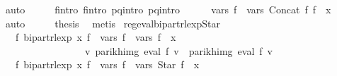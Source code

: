 \begin{isabellebody}
\ auto\isanewline
\ \ \isamarkupfalse%
\ \isamarkupfalse%
\ f{}{\isacharprime}{\kern0pt}{\isacharunderscore}{\kern0pt}intro\ f{}{\isacharprime}{\kern0pt}{\isacharunderscore}{\kern0pt}intro\ p{}{\isacharunderscore}{\kern0pt}q{}{\isacharunderscore}{\kern0pt}intro\ p{}{\isacharunderscore}{\kern0pt}q{}{\isacharunderscore}{\kern0pt}intro\isanewline
\ \ \ \ \isamarkupfalse%
\ {\isachardoublequoteopen}vars\ {\isacharquery}{\kern0pt}f{\isacharprime}{\kern0pt}\ {\isacharequal}{\kern0pt}\ vars\ {\isacharparenleft}{\kern0pt}Concat\ f{}\ f{}{\isacharparenright}{\kern0pt}\ {\isasymunion}\ {\isacharbraceleft}{\kern0pt}x{\isacharbraceright}{\kern0pt}{\isachardoublequoteclose}\ \isamarkupfalse%
\ auto\isanewline
\ \ \isamarkupfalse%
\ \isamarkupfalse%
\ {\isacharquery}{\kern0pt}thesis\ \isamarkupfalse%
\ metis\isanewline
{}\isamarkupfalse%
%
\endisatagproof
{\isafoldproof}%
%
\isadelimproof
\isanewline
%
\endisadelimproof
\isanewline
{}\isamarkupfalse%
\ reg{\isacharunderscore}{\kern0pt}eval{\isacharunderscore}{\kern0pt}bipart{\isacharunderscore}{\kern0pt}rlexp{\isacharunderscore}{\kern0pt}Star{\isacharcolon}{\kern0pt}\isanewline
\ \ \ {\isachardoublequoteopen}{\isasymexists}f{\isacharprime}{\kern0pt}{\isachardot}{\kern0pt}\ bipart{\isacharunderscore}{\kern0pt}rlexp\ x\ f{\isacharprime}{\kern0pt}\ {\isasymand}\ vars\ f{\isacharprime}{\kern0pt}\ {\isacharequal}{\kern0pt}\ vars\ f\ {\isasymunion}\ {\isacharbraceleft}{\kern0pt}x{\isacharbraceright}{\kern0pt}\isanewline
\ \ \ \ \ \ \ \ \ \ \ \ \ \ \ \ {\isasymand}\ {\isacharparenleft}{\kern0pt}{\isasymforall}v{\isachardot}{\kern0pt}\ parikh{\isacharunderscore}{\kern0pt}img\ {\isacharparenleft}{\kern0pt}eval\ f\ v{\isacharparenright}{\kern0pt}\ {\isacharequal}{\kern0pt}\ parikh{\isacharunderscore}{\kern0pt}img\ {\isacharparenleft}{\kern0pt}eval\ f{\isacharprime}{\kern0pt}\ v{\isacharparenright}{\kern0pt}{\isacharparenright}{\kern0pt}{\isachardoublequoteclose}\isanewline
\ \ \ {\isachardoublequoteopen}{\isasymexists}f{\isacharprime}{\kern0pt}{\isachardot}{\kern0pt}\ bipart{\isacharunderscore}{\kern0pt}rlexp\ x\ f{\isacharprime}{\kern0pt}\ {\isasymand}\ vars\ f{\isacharprime}{\kern0pt}\ {\isacharequal}{\kern0pt}\ vars\ {\isacharparenleft}{\kern0pt}Star\ f{\isacharparenright}{\kern0pt}\ {\isasymunion}\ {\isacharbraceleft}{\kern0pt}x{\isacharbraceright}{\kern0pt}\isanewline

\end{isabellebody}
